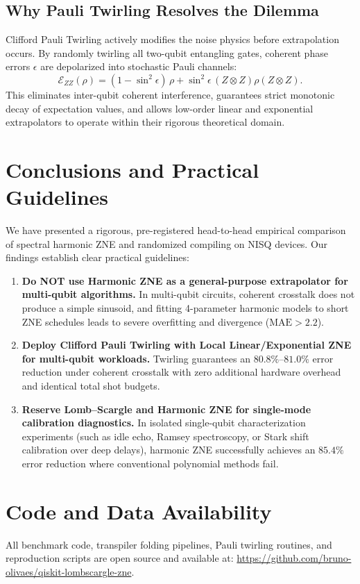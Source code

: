 \documentclass[10pt,twocolumn,a4paper]{article}
\begin{document}
\subsection{Why Pauli Twirling Resolves the Dilemma}
Clifford Pauli Twirling actively modifies the noise physics before extrapolation occurs. By randomly twirling all two-qubit entangling gates, coherent phase errors $\epsilon$ are depolarized into stochastic Pauli channels:
\begin{equation}
\mathcal{E}_{ZZ}(\rho) = (1 - \sin^2\epsilon)\,\rho + \sin^2\epsilon\,(Z \otimes Z)\rho(Z \otimes Z).
\end{equation}
This eliminates inter-qubit coherent interference, guarantees strict monotonic decay of expectation values, and allows low-order linear and exponential extrapolators to operate within their rigorous theoretical domain.

\section{Conclusions and Practical Guidelines}
We have presented a rigorous, pre-registered head-to-head empirical comparison of spectral harmonic ZNE and randomized compiling on NISQ devices. Our findings establish clear practical guidelines:
\begin{enumerate}
    \item \textbf{Do NOT use Harmonic ZNE as a general-purpose extrapolator for multi-qubit algorithms.} In multi-qubit circuits, coherent crosstalk does not produce a simple sinusoid, and fitting 4-parameter harmonic models to short ZNE schedules leads to severe overfitting and divergence ($\mathrm{MAE} > 2.2$).
    \item \textbf{Deploy Clifford Pauli Twirling with Local Linear/Exponential ZNE for multi-qubit workloads.} Twirling guarantees an $80.8\%\text{--}81.0\%$ error reduction under coherent crosstalk with zero additional hardware overhead and identical total shot budgets.
    \item \textbf{Reserve Lomb--Scargle and Harmonic ZNE for single-mode calibration diagnostics.} In isolated single-qubit characterization experiments (such as idle echo, Ramsey spectroscopy, or Stark shift calibration over deep delays), harmonic ZNE successfully achieves an $85.4\%$ error reduction where conventional polynomial methods fail.
\end{enumerate}

\section*{Code and Data Availability}
All benchmark code, transpiler folding pipelines, Pauli twirling routines, and reproduction scripts are open source and available at: \url{https://github.com/bruno-olivaes/qiskit-lombscargle-zne}.
\end{document}
